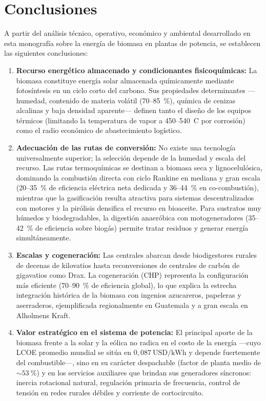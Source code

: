 \chapter*{Conclusiones}

A partir del análisis técnico, operativo, económico y ambiental desarrollado en esta monografía sobre la energía de biomasa en plantas de potencia, se establecen las siguientes conclusiones:

\begin{enumerate}[leftmargin=1.5em]
\item \textbf{Recurso energético almacenado y condicionantes fisicoquímicas:} La biomasa constituye energía solar almacenada químicamente mediante fotosíntesis en un ciclo corto del carbono. Sus propiedades determinantes ---humedad, contenido de materia volátil (70--85~\%), química de cenizas alcalinas y baja densidad aparente--- definen tanto el diseño de los equipos térmicos (limitando la temperatura de vapor a 450--540~\textdegree C por corrosión) como el radio económico de abastecimiento logístico.

\item \textbf{Adecuación de las rutas de conversión:} No existe una tecnología universalmente superior; la selección depende de la humedad y escala del recurso. Las rutas termoquímicas se destinan a biomasa seca y lignocelulósica, dominando la combustión directa con ciclo Rankine en mediana y gran escala (20--35~\% de eficiencia eléctrica neta dedicada y 36--44~\% en co-combustión), mientras que la gasificación resulta atractiva para sistemas descentralizados con motores y la pirólisis densifica el recurso en bioaceite. Para sustratos muy húmedos y biodegradables, la digestión anaeróbica con motogeneradores (35--42~\% de eficiencia sobre biogás) permite tratar residuos y generar energía simultáneamente.

\item \textbf{Escalas y cogeneración:} Las centrales abarcan desde biodigestores rurales de decenas de kilovatios hasta reconversiones de centrales de carbón de gigavatios como Drax. La cogeneración (CHP) representa la configuración más eficiente (70--90~\% de eficiencia global), lo que explica la estrecha integración histórica de la biomasa con ingenios azucareros, papeleras y aserraderos, ejemplificada regionalmente en Guatemala y a gran escala en Alholmens Kraft.

\item \textbf{Valor estratégico en el sistema de potencia:} El principal aporte de la biomasa frente a la solar y la eólica no radica en el costo de la energía ---cuyo LCOE promedio mundial se sitúa en $0{,}087~\text{USD/kWh}$ y depende fuertemente del combustible---, sino en su carácter despachable (factor de planta medio de $\sim 53~\%$) y en los servicios auxiliares que brindan sus generadores síncronos: inercia rotacional natural, regulación primaria de frecuencia, control de tensión en redes rurales débiles y corriente de cortocircuito.


\end{enumerate}
